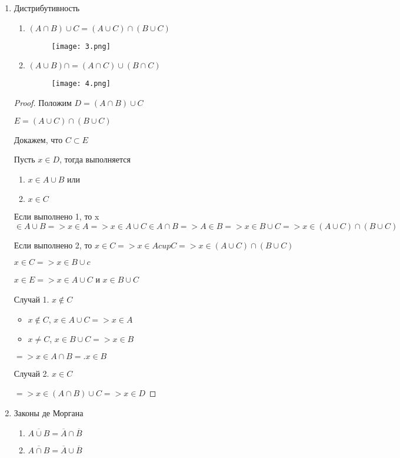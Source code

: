 \begin{enumerate}
\item {
Дистрибутивность

\begin{enumerate}
    \item $(A \cap B) \cup C = (A \cup C) \cap (B \cup C)$
    \begin{figure}[H]
        \centering
        \texttt{[image: 3.png]}
        
        
        \label{fig:3}
    \end{figure}
    \item $(A \cup B) \cap = (A \cap C) \cup (B \cap C)$
    \begin{figure}[H]
        \centering
        \texttt{[image: 4.png]}
        
        
        \label{fig:4}
    \end{figure}
\end{enumerate}
    

\begin{proof}
Положим $D = (A \cap B) \cup C$

$E = (A \cup C) \cap (B \cup C)$

Докажем, что $C \subset E$

Пусть $x \in D$, тогда выполняется
\begin{enumerate}
    \item $x \in A \cup B$ 
    или
    \item $x \in C$
\end{enumerate}

Если выполнено 1, то x $\in A \cup B => x \in A => x \in A \cup C \in  A \cap B => A \in B => x \in B \cup C => x \in (A \cup C) \cap (B \cup C)$

Если выполнено 2, то $x \in C => x \in A cup C => x \in (A \cup C) \cap (B \cup C)$

$x \in C => x \in B \cup c$

$x \in E => x \in A \cup C$ и $x \in B \cup C$

Случай 1. $x \notin C$

\begin{itemize}
    \item $x \notin C$, $x \in A \cup C => x\in A$
    \item $x \neq C$, $x \in B \cup C => x \in B$
\end{itemize}

$=> x \in A \cap B =. x \in B$

Случай 2. $x \in C$

$=> x \in (A \cap B) \cup C => x \in D$
\end{proof}

}
\item {
Законы де Моргана
\begin{enumerate}
    \item $\overline{A \cup B} = \overline A \cap \overline B$
    \item $\overline{A \cap B} = \overline A \cup \overline B$
\end{enumerate}
}
\end{enumerate}

